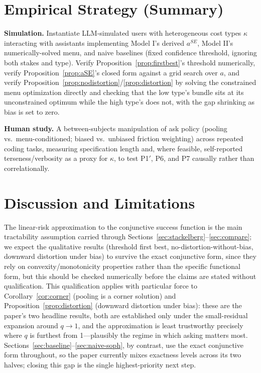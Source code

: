 \documentclass[11pt]{article}
\begin{document}
\section{Empirical Strategy (Summary)}

\textbf{Simulation.} Instantiate LLM-simulated users with heterogeneous cost
types $\kappa$ interacting with assistants implementing Model I's derived
$a^{SE}$, Model II's numerically-solved menu, and naive baselines (fixed
confidence threshold, ignoring both stakes and type). Verify
Proposition~\ref{prop:firstbest}'s threshold numerically, verify
Proposition~\ref{prop:aSE}'s closed form against a grid search over $a$, and
verify Proposition~\ref{prop:nodistortion}/\ref{prop:distortion} by solving the
constrained menu optimization directly and checking that the low type's bundle
sits at its unconstrained optimum while the high type's does not, with the gap
shrinking as bias is set to zero.

\textbf{Human study.} A between-subjects manipulation of ask policy (pooling vs.\
menu-conditioned; biased vs.\ unbiased friction weighting) across repeated coding
tasks, measuring specification length and, where feasible, self-reported
terseness/verbosity as a proxy for $\kappa$, to test P1$'$, P6, and P7 causally
rather than correlationally.

\section{Discussion and Limitations}
\label{sec:discussion}

The linear-risk approximation to the conjunctive success function is the main
tractability assumption carried through Sections~\ref{sec:stackelberg}--\ref{sec:compare};
we expect the qualitative results (threshold first best, no-distortion-without-bias,
downward distortion under bias) to survive the exact conjunctive form, since
they rely on convexity/monotonicity properties rather than the specific
functional form, but this should be checked numerically before the claims are
stated without qualification. This qualification applies with particular force to
Corollary~\ref{cor:corner} (pooling is a corner solution) and
Proposition~\ref{prop:distortion} (downward distortion under bias): these are the
paper's two headline results, both are established only under the small-residual
expansion around $q\to1$, and the approximation is least trustworthy precisely
where $q$ is furthest from 1---plausibly the regime in which asking matters most.
Sections~\ref{sec:baseline}--\ref{sec:naive-soph}, by contrast, use the exact
conjunctive form throughout, so the paper currently mixes exactness levels across
its two halves; closing this gap is the single highest-priority next step.
\end{document}
